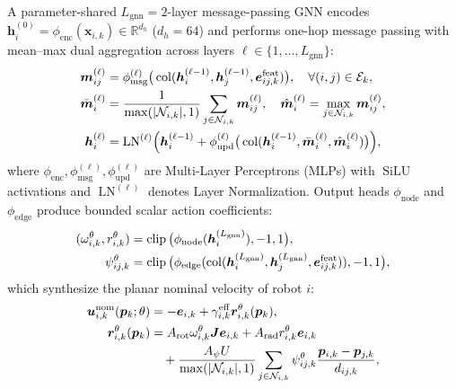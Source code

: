 A parameter-shared $L_{\mathrm{gnn}}=2$-layer message-passing GNN encodes $\boldsymbol h_i^{(0)}=\phi_{\mathrm{enc}}(\boldsymbol x_{i,k})\in\mathbb R^{d_h}$ ($d_h=64$) and performs one-hop message passing with mean--max dual aggregation across layers $\ell\in\{1,\dots,L_{\mathrm{gnn}}\}$:
\begin{equation}
\begin{split}
 \boldsymbol m_{ij}^{(\ell)}&=\phi_{\mathrm{msg}}^{(\ell)}\big(\operatorname{col}(\boldsymbol h_i^{(\ell-1)},\boldsymbol h_j^{(\ell-1)},\boldsymbol e_{ij,k}^{\mathrm{feat}})\big),\quad\forall (i,j)\in\mathcal E_k,\\
 \bar{\boldsymbol m}_i^{(\ell)}&=\frac{1}{\max(|\mathcal N_{i,k}|,1)}\sum_{j\in\mathcal N_{i,k}}\boldsymbol m_{ij}^{(\ell)},\quad
 \hat{\boldsymbol m}_i^{(\ell)}=\max_{j\in\mathcal N_{i,k}}\boldsymbol m_{ij}^{(\ell)},\\
 \boldsymbol h_i^{(\ell)}&=\operatorname{LN}^{(\ell)}\!\Big(\boldsymbol h_i^{(\ell-1)}+\phi_{\mathrm{upd}}^{(\ell)}\big(\operatorname{col}(\boldsymbol h_i^{(\ell-1)},\bar{\boldsymbol m}_i^{(\ell)},\hat{\boldsymbol m}_i^{(\ell)})\big)\Big),
\end{split}\label{eq:gnn-layer}
\end{equation}
where $\phi_{\mathrm{enc}},\phi_{\mathrm{msg}}^{(\ell)},\phi_{\mathrm{upd}}^{(\ell)}$ are Multi-Layer Perceptrons (MLPs) with $\operatorname{SiLU}$ activations and $\operatorname{LN}^{(\ell)}$ denotes Layer Normalization. Output heads $\phi_{\mathrm{node}}$ and $\phi_{\mathrm{edge}}$ produce bounded scalar action coefficients:
\begin{equation}
\begin{split}
 (\omega_{i,k}^\theta,r_{i,k}^\theta)&=\operatorname{clip}\big(\phi_{\mathrm{node}}(\boldsymbol h_i^{(L_{\mathrm{gnn}})}),-1,1\big),\\
 \psi_{ij,k}^\theta&=\operatorname{clip}\big(\phi_{\mathrm{edge}}(\operatorname{col}(\boldsymbol h_i^{(L_{\mathrm{gnn}})},\boldsymbol h_j^{(L_{\mathrm{gnn}})},\boldsymbol e_{ij,k}^{\mathrm{feat}})),-1,1\big),
\end{split}\label{eq:action-heads}
\end{equation}
which synthesize the planar nominal velocity of robot $i$:
\begin{equation}
\begin{split}
 \boldsymbol{u}_{i,k}^{\mathrm{nom}}(\boldsymbol{p}_k;\theta)&=-\boldsymbol{e}_{i,k}+\gamma_{i,k}^{\mathrm{eff}}\boldsymbol{r}_{i,k}^\theta(\boldsymbol{p}_k),\\
 \boldsymbol{r}_{i,k}^\theta(\boldsymbol{p}_k)&=A_{\mathrm{rot}}\omega_{i,k}^\theta\boldsymbol{J}\boldsymbol{e}_{i,k}+A_{\mathrm{rad}}r_{i,k}^\theta\boldsymbol{e}_{i,k}\\
 &\quad+\frac{A_\psi U}{\max(|\mathcal N_{i,k}|,1)}\sum_{j\in\mathcal N_{i,k}}\psi_{ij,k}^\theta\frac{\boldsymbol{p}_{i,k}-\boldsymbol{p}_{j,k}}{d_{ij,k}},
\end{split}\label{eq:nominal-law}
\end{equation}
